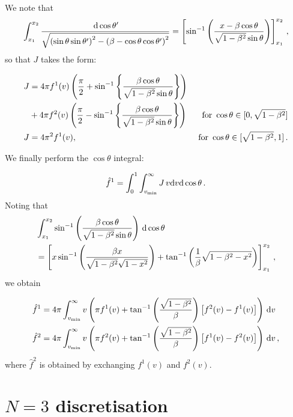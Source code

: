 We note that
\begin{equation}
\int_{x_1}^{x_2} \frac{\, \mathrm{d}\cos\theta'}{\sqrt{\left(\sin\theta\sin\theta'\right)^2 - \left(\beta - \cos\theta\cos\theta'\right)^2}} = \left[\sin^{-1}\left(\frac{x-\beta\cos\theta}{\sqrt{1-\beta^2}\sin\theta}\right)\right]_{x_1}^{x_2}\,,
\end{equation}
so that $J$ takes the form:

\begin{align}
J &= 4\pi f^1(v)\left(\frac{\pi}{2} + \sin^{-1}\left\{\frac{\beta\cos\theta}{\sqrt{1-\beta^2}\sin\theta}\right\}\right) \nonumber \\
& + 4\pi f^2(v)\left(\frac{\pi}{2} - \sin^{-1}\left\{\frac{\beta\cos\theta}{\sqrt{1-\beta^2}\sin\theta}\right\}\right) & \textrm{ for } \cos\theta \in [0,\sqrt{1-\beta^2}] \nonumber \\
J &= 4\pi^2 f^1(v), & \textrm{ for } \cos\theta \in [\sqrt{1-\beta^2},1]\,.
\end{align}

We finally perform the $\cos\theta$ integral:

\begin{equation}
\hat{f}^1 = \int_{0}^{1} \int_{\vmin}^{\infty}  J \, v \mathrm{d}v \mathrm{d}\cos\theta\,.
\end{equation}
Noting that
\begin{align}
\label{eq:RadonCalc:K0}
&\int_{x_1}^{x_2} \sin^{-1}\left(\frac{\beta\cos\theta}{\sqrt{1-\beta^2}\sin\theta}\right) \,\mathrm{d}\cos\theta \notag\\
& =\left[ x \sin^{-1}\left(\frac{\beta x}{\sqrt{1-\beta^2}\sqrt{1-x^2}}\right) + \tan^{-1}\left(\frac{1}{\beta}\sqrt{1-\beta^2 -x^2}\right)\right]_{x_1}^{x_2}\,,
\end{align}
we obtain

\begin{align}
\label{eq:RadonCalc:N2result}
\hat{f}^1 &= 4\pi\int_{\vmin}^{\infty} v \left( \pi f^1(v) + \atan\left(\frac{\sqrt{1-\beta^2}}{\beta}\right)\left[f^2(v) - f^1(v)\right] \right) \, \mathrm{d}v \\
\hat{f}^2 &= 4\pi\int_{\vmin}^{\infty} v \left( \pi f^2(v) + \atan\left(\frac{\sqrt{1-\beta^2}}{\beta}\right)\left[f^1(v) - f^2(v)\right] \right) \, \mathrm{d}v\,,
\end{align}
where $\hat{f}^2$ is obtained by exchanging $f^1(v)$ and $f^2(v)$.

\section{$N=3$ discretisation}

